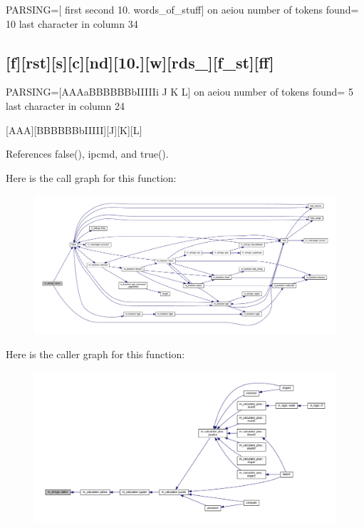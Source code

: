 P\+A\+R\+S\+I\+NG=\mbox{[} first second 10. words\+\_\+of\+\_\+stuff\mbox{]} on aeiou number of tokens found= 10 last character in column 34

\subsection*{\mbox{[}f\mbox{]}\mbox{[}rst\mbox{]}\mbox{[}s\mbox{]}\mbox{[}c\mbox{]}\mbox{[}nd\mbox{]}\mbox{[}10.\mbox{]}\mbox{[}w\mbox{]}\mbox{[}rds\+\_\+\mbox{]}\mbox{[}f\+\_\+st\mbox{]}\mbox{[}ff\mbox{]} }

P\+A\+R\+S\+I\+NG=\mbox{[}A\+A\+Aa\+B\+B\+B\+B\+B\+Bb\+I\+I\+I\+I\+Ii J K L\mbox{]} on aeiou number of tokens found= 5 last character in column 24

\mbox{[}A\+AA\mbox{]}\mbox{[}B\+B\+B\+B\+B\+Bb\+I\+I\+I\+II\mbox{]}\mbox{[}J\mbox{]}\mbox{[}K\mbox{]}\mbox{[}L\mbox{]} 

References false(), ipcmd, and true().

Here is the call graph for this function\+:
\nopagebreak
\begin{figure}[H]
\begin{center}
\leavevmode
\includegraphics[width=350pt]{namespacem__strings_a9890da826d63d6f04367887007611cb5_cgraph}
\end{center}
\end{figure}
Here is the caller graph for this function\+:
\nopagebreak
\begin{figure}[H]
\begin{center}
\leavevmode
\includegraphics[width=350pt]{namespacem__strings_a9890da826d63d6f04367887007611cb5_icgraph}
\end{center}
\end{figure}
\mbox{\label{namespacem__strings_a8d7007f0c34d7db4c004dac56e609b3f}} 
